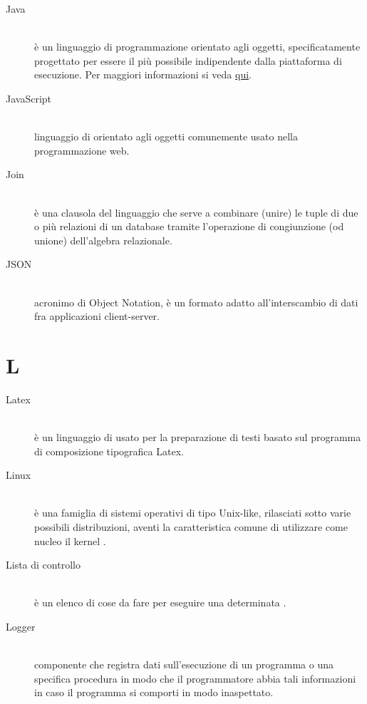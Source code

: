 \documentclass[12pt,a4paper]{article}
\begin{document}
\begin{description}
\item[Java] 
\hfill\\ è un linguaggio di programmazione orientato agli oggetti, specificatamente progettato per essere il più possibile indipendente dalla piattaforma di esecuzione. Per maggiori informazioni si veda \href{https://it.wikipedia.org/wiki/Java_(linguaggio_di_programmazione)}{qui}.

\item[JavaScript] 
\hfill\\ linguaggio di  orientato agli oggetti comunemente usato nella programmazione web.

\item[Join] 
\hfill\\ è una clausola del linguaggio  che serve a combinare (unire) le tuple di due o più relazioni di un database tramite l'operazione di congiunzione (od unione) dell'algebra relazionale.

\item[JSON] 
\hfill\\ acronimo di  Object Notation, è un formato adatto all'interscambio di dati fra applicazioni client-server.
\end{description}

\newpage

\section{L}

\begin{description}
\item[Latex] 
\hfill\\ è un linguaggio di  usato per la preparazione di testi basato sul programma di composizione tipografica Latex.

\item[Linux] 
\hfill\\ è una famiglia di sistemi operativi  di tipo Unix-like, rilasciati sotto varie possibili distribuzioni, aventi la caratteristica comune di utilizzare come nucleo il kernel .

\item[Lista di controllo] 
\hfill\\ è un elenco di cose da fare per eseguire una determinata .

\item[Logger] 
\hfill\\componente che registra dati sull'esecuzione di un programma o una specifica procedura in modo che il programmatore abbia tali informazioni in caso il programma si comporti in modo inaspettato.
\end{description}
\end{document}
